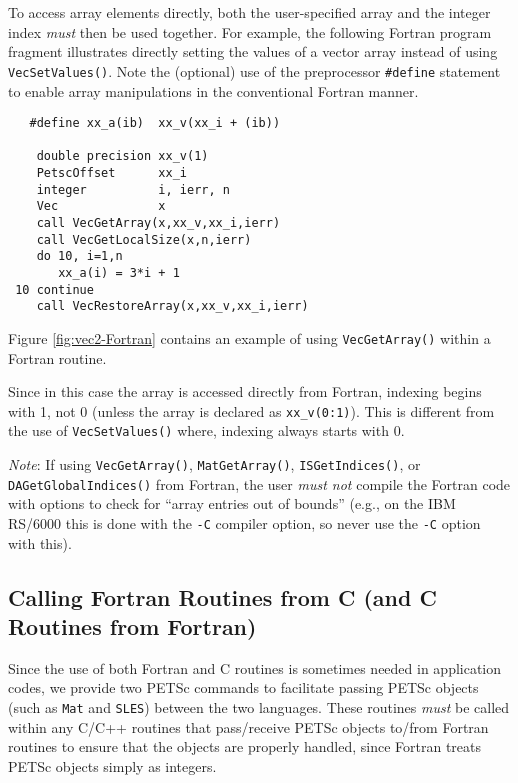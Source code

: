 To access array elements directly, both the user-specified array and
the integer index {\em must} then be used together.  
For example, the following Fortran program fragment illustrates
directly setting the values of a vector array instead of using {\tt
VecSetValues()}.  Note the (optional) use of the preprocessor 
{\tt \#define} statement to enable array manipulations in the conventional
Fortran manner.
\begin{verbatim}
   #define xx_a(ib)  xx_v(xx_i + (ib))

    double precision xx_v(1)
    PetscOffset      xx_i
    integer          i, ierr, n
    Vec              x
    call VecGetArray(x,xx_v,xx_i,ierr)
    call VecGetLocalSize(x,n,ierr)
    do 10, i=1,n
       xx_a(i) = 3*i + 1
 10 continue
    call VecRestoreArray(x,xx_v,xx_i,ierr)
\end{verbatim}
Figure \ref{fig:vec2-Fortran} contains an example of using {\tt VecGetArray()}
within a Fortran routine.

Since in this case the array is accessed directly from Fortran,
indexing begins with 1, not 0 (unless the array is declared as {\tt xx\_v(0:1)}).
This is different from the use of {\tt VecSetValues()}
where, indexing always starts with 0.

{\em Note}: If using {\tt VecGetArray()}, {\tt MatGetArray()}, {\tt ISGetIndices()},
or {\tt DAGetGlobalIndices()}
from Fortran, the user {\em must not} compile the Fortran code with options 
to check for ``array entries out of bounds'' (e.g., on the IBM RS/6000 this 
is done with the {\tt -C} compiler option, so never use the {\tt -C} option with this).

\subsection{Calling Fortran Routines from C (and C Routines from Fortran)}

Since the use of both Fortran and C routines is sometimes needed in
application codes, we provide two PETSc commands to facilitate passing
PETSc objects (such as {\tt Mat} and {\tt SLES}) between the two
languages.  These routines {\em must} be called within any C/C++
routines that pass/receive PETSc objects to/from Fortran routines to
ensure that the objects are properly handled, since Fortran treats PETSc
objects simply as integers.

